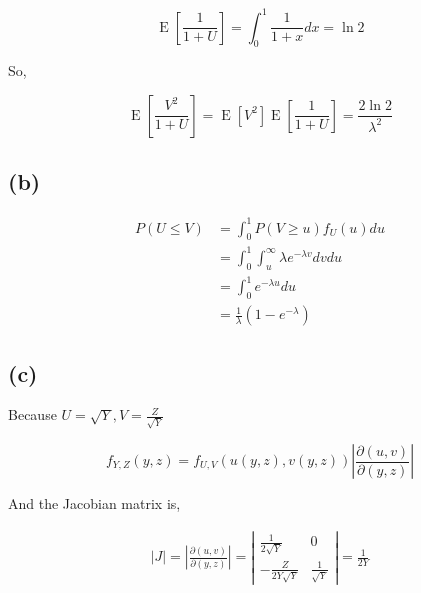 \documentclass{article}
\begin{document}
\begin{equation}
    \operatorname{E}\left[\frac{1}{1+U}\right] = \int_{0}^{1} \frac {1}{1+x} dx = \ln 2
\end{equation}

So,

\begin{equation}
    \operatorname{E}\left[\frac{V^2}{1+U}\right]= \operatorname{E}[V^2] \operatorname{E}\left[\frac{1}{1+U}\right] = \frac{2\ln 2}{\lambda^2}
\end{equation}

\subsection{(b)}

\begin{equation}
    \begin{aligned}
        P(U\leqslant V) & = \int_{0}^1 P(V\geqslant u) f_U(u)du \\
        & = \int_{0}^1 \int_{u}^{\infty} \lambda  e^{-\lambda v} dv du \\
        & =  \int_{0}^1 e^{-\lambda u}du \\
        & =  \frac 1 {\lambda} (1-e^{-\lambda})
    \end{aligned}
\end{equation}

\subsection{(c)}

Because $U =\sqrt{Y}, V = \frac{Z}{\sqrt{Y}}$ 

\begin{equation}
    f_{Y,Z}(y, z)=f_{U,V}(u(y,z), v(y,z))\left|\frac{\partial(u,v)}{\partial(y,z)}\right|
\end{equation}

And the Jacobian matrix is,

\begin{equation}
    \begin{aligned}
        \left|J\right| = \left|\frac{\partial(u,v)}{\partial(y,z)}\right| = \left|\begin{matrix}
            \frac{1}{2\sqrt{Y}}&0\\-\frac{Z}{2Y\sqrt{Y}}&\frac{1}{\sqrt{Y}} 
        \end{matrix}\right| = \frac{1}{2Y}
    \end{aligned}
\end{equation}
\end{document}
